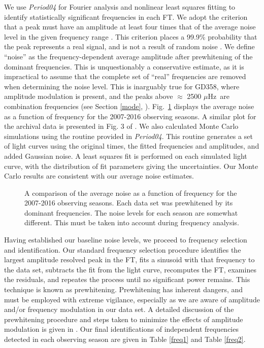 \documentclass[12pt,preprint]{aastex}
\begin{document}
We use {\sl Period04} \citep{Lenz05} for Fourier analysis and nonlinear least squares fitting to 
identify statistically significant frequencies in each FT. We adopt the criterion that a peak must have 
an amplitude at least four times that of the average noise level in the given frequency range 
\citep{Provencal12}. This criterion places a 99.9\% probability that the peak represents a real signal,
and is not a result of random noise \citep{Scargle82, Provencal12}.  We define ``noise'' as the frequency-dependent 
average amplitude after prewhitening of the dominant frequencies. This is unquestionably a conservative estimate, 
as it is impractical to assume that the complete set of ``real'' frequencies are removed when determining
the noise level. This is inarguably true for GD358, where amplitude modulation is present, and the peaks above $\approx$ 2500 $\mu$Hz\ 
are combination frequencies (see Section \ref{mode}, \citet{Provencal09}).  Fig.~\ref{noise} displays the average noise 
as a function of frequency for the 2007-2016 observing seasons. A similar plot for the 
archival data is presented in Fig. 3 of \citet{Provencal09}. We also calculated Monte Carlo 
simulations using the routine provided in {\sl Period04}.  This routine generates a set of light curves using 
the original times, the fitted frequencies and amplitudes, and added Gaussian noise. A least squares fit is 
performed on each simulated light curve, with the distribution of fit parameters giving the uncertainties. 
Our Monte Carlo results are consistent with our average noise estimates.

\begin{figure}
\caption{A comparison of the average noise as a function of frequency for the 2007-2016 observing 
seasons.  Each data set was prewhitened by its dominant frequencies.  The noise levels for each 
season are somewhat different.  This must be taken into account during frequency analysis.  
\label{noise}
}
\end{figure}

Having established our baseline noise levels, we proceed to frequency selection and identification.
Our standard frequency selection procedure identifies the largest amplitude resolved peak in the FT,
fits a sinusoid with that frequency to the data set, subtracts the fit from the light curve, 
recomputes the FT, examines the residuals, and repeates the process until no significant power 
remains. This technique is known as prewhitening. Prewhitening has inherent dangers, and must be 
employed with extreme vigilance, especially as we are aware of amplitude and/or frequency 
modulation in our data set. A detailed discussion of the prewhitening procedure and steps 
taken to minimize the effects of amplitude modulation is given in \citet{Provencal09}. Our final 
identifications of independent frequencies detected in each observing season are given in 
Table \ref{freq1} and Table \ref{freq2}.
\end{document}
